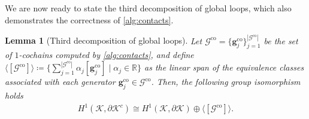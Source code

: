 \documentclass[a4paper,twoside,10pt]{article}
\theoremstyle{plain}
\newtheorem{lemma}{Lemma}
\theoremstyle{definition}
\theoremstyle{remark}
\newcommand{\mc}{\mathcal}
\newcommand{\R}{\mathbb{R}}
\newcommand{\K}{\mc{K}}
\newcommand{\cochain}[1]{\mathbf #1}
\newcommand{\abs}[1]{|{#1}|}
\newcommand{\eqclassspan}[1]{\langle{[#1]}\rangle}
\newcommand{\co}{\mathrm{co}}
\begin{document}
We are now ready to state the third decomposition of global loops, which also demonstrates the correctness of \cref{alg:contacts}.
\begin{lemma}[Third decomposition of global loops]
\label{lem:decomposition.c}
Let $\mc G^{\co}=\{\cochain g^{\co}_j\}_{j=1}^{\abs{\mc G^{\co}}}$ be the set of $1$-cochains computed by \cref{alg:contacts}, and define $\eqclassspan{\mc G^{\co}} \coloneqq \{\sum_{j=1}^{\abs{\mc G^{\co}}} \alpha_j [\cochain g^{\co}_j] \mid \alpha_j \in \R\}$ as the linear span of the equivalence classes associated with each generator $\cochain g^{\co}_j \in \mc G^{\co}$.
Then, the following group isomorphism holds
\begin{align}
H^1(\K, \partial \K^{c}) \cong H^1(\K, \partial \K) \oplus \eqclassspan{\mc G^{\co}}.
\label{eq:decomposition.c}
\end{align}
\end{lemma}
\end{document}
